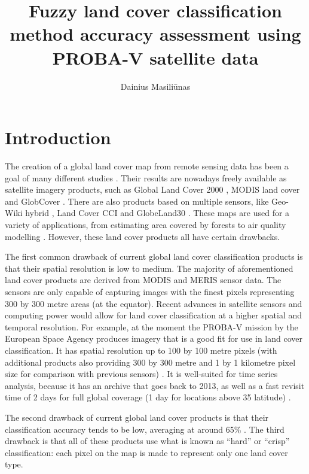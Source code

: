 \documentclass[a4paper,10pt]{article}
\title{Fuzzy land cover classification method accuracy assessment using PROBA-V satellite data}
\author{Dainius Masili\=unas}
\begin{document}
\maketitle

\section{Introduction}

The creation of a global land cover map from remote sensing data has been a goal of many different studies \cite{hansen2000hardtree}. Their results are nowadays freely available as satellite imagery products, such as Global Land Cover 2000 \cite{bartholome2005glc2000}, MODIS land cover \cite{friedl2010modis} and GlobCover \cite{arino2007globcover}. There are also products based on multiple sensors, like Geo-Wiki hybrid \cite{see2015hybrid}, Land Cover CCI \cite{lccciguide} and GlobeLand30 \cite{arsanjani2016globeland30}. These maps are used for a variety of applications, from estimating area covered by forests \cite{bartalev2014probavboreal} to air quality modelling \cite{wiedinmyer2006airquality}. However, these land cover products all have certain drawbacks.

The first common drawback of current global land cover classification products is that their spatial resolution is low to medium. The majority of aforementioned land cover products are derived from MODIS and MERIS sensor data. The sensors are only capable of capturing images with the finest pixels representing 300 by 300 metre areas (at the equator). Recent advances in satellite sensors and computing power would allow for land cover classification at a higher spatial and temporal resolution. For example, at the moment the PROBA-V mission by the European Space Agency produces imagery that is a good fit for use in land cover classification. It has spatial resolution up to 100 by 100 metre pixels (with additional products also providing 300 by 300 metre and 1 by 1 kilometre pixel size for comparison with previous sensors) \cite{probavguide}. It is well-suited for time series analysis, because it has an archive that goes back to 2013, as well as a fast revisit time of 2 days for full global coverage (1 day for locations above 35\textdegree{} latitude) \cite{dierckx2014probav}.

The second drawback of current global land cover products is that their classification accuracy tends to be low, averaging at around 65\% \cite{tsendbazar2016integrating}. The third drawback is that all of these products use what is known as ``hard'' or ``crisp'' classification: each pixel on the map is made to represent only one land cover type.
\end{document}
